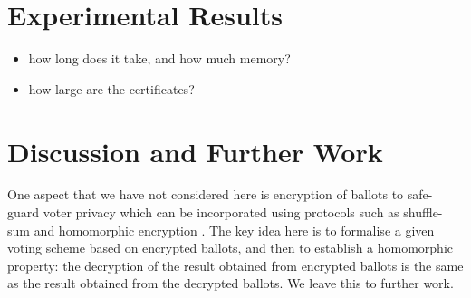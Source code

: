 \documentclass{llncs}
\begin{document}
\section{Experimental Results}
\begin{itemize}
  \item how long does it take, and how much memory?
  \item how large are the certificates?
\end{itemize}


\section{Discussion and Further Work}



One aspect that we have not considered here is encryption of
ballots to safe-guard voter privacy which can be incorporated using
protocols such as shuffle-sum \cite{Benaloh:2009:SSC} and
homomorphic encryption \cite{Yi:2014:HEA}. The key idea here is to
formalise a given voting scheme based on encrypted ballots, and then
to establish a homomorphic property: the decryption of the result
obtained from encrypted ballots is the same as the result obtained from
the decrypted ballots.  We leave this to further work.



\end{document}
